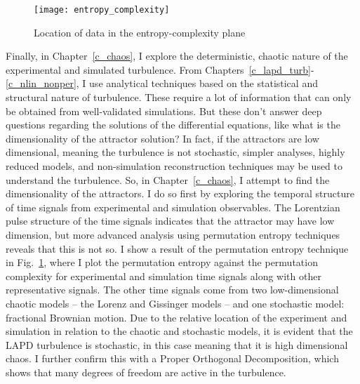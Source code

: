 \begin{figure}
\centerline{\texttt{[image: entropy\_complexity]}}
\caption{Location of data in the entropy-complexity plane}
\label{entropy_complexity_intro}
\end{figure}

Finally, in Chapter~\ref{c_chaos}, I explore the deterministic, chaotic nature of the experimental and simulated turbulence. From Chapters~\ref{c_lapd_turb}-\ref{c_nlin_nonper}, I
use analytical techniques based on the statistical and structural nature of turbulence. These require a lot of information that can only be obtained from well-validated simulations.
But these don't answer deep questions regarding the solutions of the differential equations, like what is the dimensionality of the attractor solution? In fact, if the attractors are low
dimensional, meaning the turbulence is not stochastic, simpler analyses, highly reduced models, and non-simulation reconstruction techniques may be used to understand the turbulence.
So, in Chapter~\ref{c_chaos}, I attempt to find the dimensionality of the attractors. I do so first by exploring the temporal structure of time signals from experimental and simulation
observables. The Lorentzian pulse structure of the time signals indicates that the attractor may have low dimension, but more advanced analysis using permutation entropy techniques
reveals that this is not so. I show a result of the permutation entropy technique in Fig.~\ref{entropy_complexity_intro}, where I plot the permutation entropy against the permutation
complexity for experimental and simulation time signals along with other representative signals. The other time signals come from two low-dimensional chaotic models -- the Lorenz and Gissinger models --
and one stochastic model: fractional Brownian motion. Due to the relative location of the experiment and simulation in relation to the chaotic and stochastic models, it is evident that
the LAPD turbulence is stochastic, in this case meaning that it is high dimensional chaos. I further confirm this with a Proper Orthogonal Decomposition, which shows that many degrees of freedom are
active in the turbulence.
